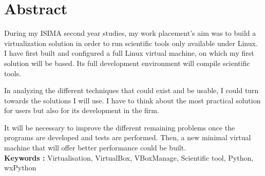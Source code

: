 \cleardoublepage



\chapter*{Abstract}

\thispagestyle{empty}



During my ISIMA second year studies, my work placement's aim was to build a virtualization solution in order to run scientific tools only available under Linux.
\\



I have first built and configured a full Linux virtual machine, on which my first solution will be based.
Its full development environment will compile scientific tools.

In analyzing the different techniques that could exist and be usable, I could turn towards the solutions I will use.
I have to think about the most practical solution for users but also for its development in the firm.

It will be necessary to improve the different remaining problems once the programs are developed and tests are performed. 
Then, a new minimal virtual machine that will offer better performance could be built.
\\



\textbf{Keywords : }
Virtualisation, VirtualBox, VBoxManage, Scientific tool, Python, wxPython